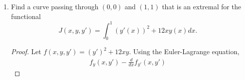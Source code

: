 \documentclass{article}
\begin{document}
\begin{enumerate}
\begin{proof}
                  Therefore,
                  \begin{align*}
                        -2y'' - 1 & = 0                        \\
                        y''       & = -\frac{1}{2}             \\
                        y'        & = -\frac{x}{2} + c_1       \\
                        y         & = -\frac{x^2}{4}+xc_1+c_2.
                  \end{align*}
                  To find the values of the constants, we are left with the following
                  system of equations:
                  \begin{align*}
                        2           & = -\frac{1^2}{4}+(1)c_1+c_2                \\
                        4           & = -\frac{2^2}{4}+(2)c_1+c_2                \\
                        \\
                        \frac{9}{4} & = c_1+c_2                                  \\
                        5           & = 2c_1+c_2                                 \\
                        \\
                        c_1         & = \frac{11}{4}                             \\
                        c_2         & = -\frac{1}{2}                             \\
                        \\
                        \therefore
                        y(x)        & = -\frac{x^2}{4}+\frac{11x}{4}-\frac{1}{2}
                  \end{align*}
            \end{proof}
            \setcounter{enumi}{4}
      \item Find a curve passing through $(0,0)$ and $(1,1)$ that is an extremal
            for the functional
            \begin{equation}
                  J(x, y, y') = \int_0^1(y'(x))^2+12xy(x)dx.
            \end{equation}
            \begin{proof}
                  Let $f(x, y, y')=(y')^2+12xy$. Using the Euler-Lagrange equation,
                  \begin{align*}
                        f_y(x, y') - \frac{d}{dx}f_{y'}(x, y')

\end{align*}
\end{proof}
\end{enumerate}
\end{document}
